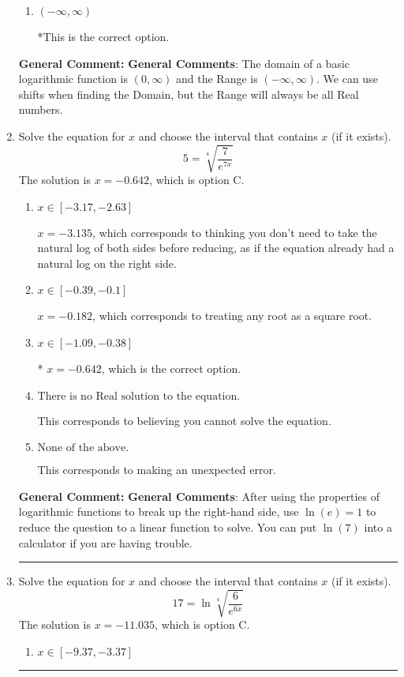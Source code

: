 \documentclass{extbook}[14pt]
\newcommand{\litem}[1]{\item #1

\rule{\textwidth}{0.4pt}}
\begin{document}
\begin{enumerate}
{\begin{enumerate}[label=\Alph*.]
$[6, \infty)$, which corresponds to using the negative of the horizontal shift AND including the endpoint.
\item \( (-\infty, \infty) \)

*This is the correct option.
\end{enumerate}

\textbf{General Comment:} \textbf{General Comments}: The domain of a basic logarithmic function is $(0, \infty)$ and the Range is $(-\infty, \infty)$. We can use shifts when finding the Domain, but the Range will always be all Real numbers.
}
\litem{
 Solve the equation for $x$ and choose the interval that contains $x$ (if it exists).
\[  5 = \sqrt[4]{\frac{7}{e^{7x}}} \]The solution is \( x = -0.642 \), which is option C.\begin{enumerate}[label=\Alph*.]
\item \( x \in [-3.17, -2.63] \)

$x = -3.135$, which corresponds to thinking you don't need to take the natural log of both sides before reducing, as if the equation already had a natural log on the right side.
\item \( x \in [-0.39, -0.1] \)

$x = -0.182$, which corresponds to treating any root as a square root.
\item \( x \in [-1.09, -0.38] \)

* $x = -0.642$, which is the correct option.
\item \( \text{There is no Real solution to the equation.} \)

This corresponds to believing you cannot solve the equation.
\item \( \text{None of the above.} \)

This corresponds to making an unexpected error.
\end{enumerate}

\textbf{General Comment:} \textbf{General Comments}: After using the properties of logarithmic functions to break up the right-hand side, use $\ln(e) = 1$ to reduce the question to a linear function to solve. You can put $\ln(7)$ into a calculator if you are having trouble.
}
\litem{
 Solve the equation for $x$ and choose the interval that contains $x$ (if it exists).
\[  17 = \ln{\sqrt[4]{\frac{6}{e^{6x}}}} \]The solution is \( x = -11.035 \), which is option C.\begin{enumerate}[label=\Alph*.]
\item \( x \in [-9.37, -3.37] \)


\end{enumerate}}
\end{enumerate}
\end{document}
